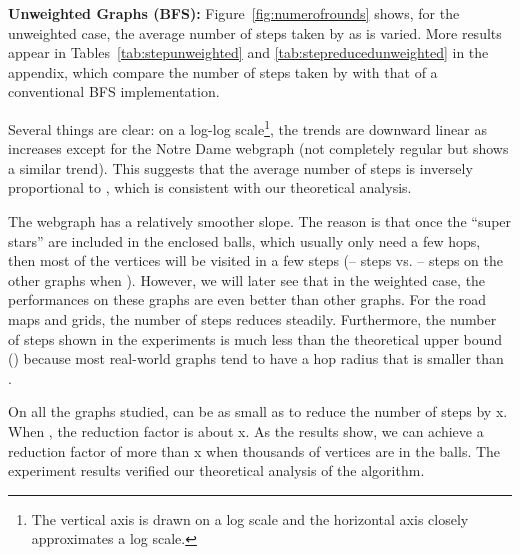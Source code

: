 \medskip

\noindent
\textbf{Unweighted Graphs (BFS):} Figure~\ref{fig:numerofrounds} shows, for the
unweighted case, the average number of steps taken by \AlgName{} as  is
varied.  More results appear in Tables~\ref{tab:stepunweighted} and
\ref{tab:stepreducedunweighted} in the appendix, which compare the number of
steps taken by \AlgName with that of a conventional BFS implementation.

Several things are clear: on a log-log scale\footnote{The vertical axis is drawn
  on a log scale and the horizontal axis closely approximates a log scale.}, the
trends are downward linear as  increases except for the Notre Dame
webgraph (not completely regular but shows a similar trend).  This suggests that
the average number of steps is inversely proportional to , which is
consistent with our theoretical analysis.

The webgraph has a relatively smoother slope. The reason is that once the
``super stars'' are included in the enclosed balls, which usually only need a few
hops, then most of the vertices will be visited in a few steps (--
steps vs. -- steps on the other graphs when ).  However, we
will later see that in the weighted case, the performances on these graphs are
even better than other graphs.  For the road maps and grids, the number of steps
reduces steadily. Furthermore, the number of steps shown in the experiments is
much less than the theoretical upper bound () because
most real-world graphs tend to have a hop radius that is smaller than .







On all the graphs studied,  can be as small as  to reduce the number
of steps by x.  When , the reduction factor is about x.  As the
results show, we can achieve a reduction factor of more than x when thousands of
vertices are in the balls.
The experiment results verified our theoretical analysis of the \AlgName{} algorithm.

